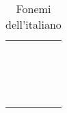 \begin{center}
\begin{longtable}{ | l | p{2cm} | p{4.7cm} | p{2.5cm} |}
       			 & &  \newline  \\ \hline
        		 & &  \newline  \\ \hline
       			 & & \newline  \\ \hline
                         & & \newline  \\ \hline
                         & & \newline  \\ \hline
                         & & \newline  \\ \hline
                         & & \newline  \\ \hline
                         & & \newline  \\ \hline
                         & & \newline  \\ \hline
                         & & \newline  \\ \hline
                         & & \newline  \\ \hline
                         & & \newline  \\ \hline
                         & & \newline  \\ \hline
                         & & \newline  \\ \hline
                         & & \newline  \\ \hline
                         & & \newline  \\ \hline
        	        \caption{Fonemi dell'italiano}
        	        \end{longtable}
        	        \egroup
     	        \end{center}
